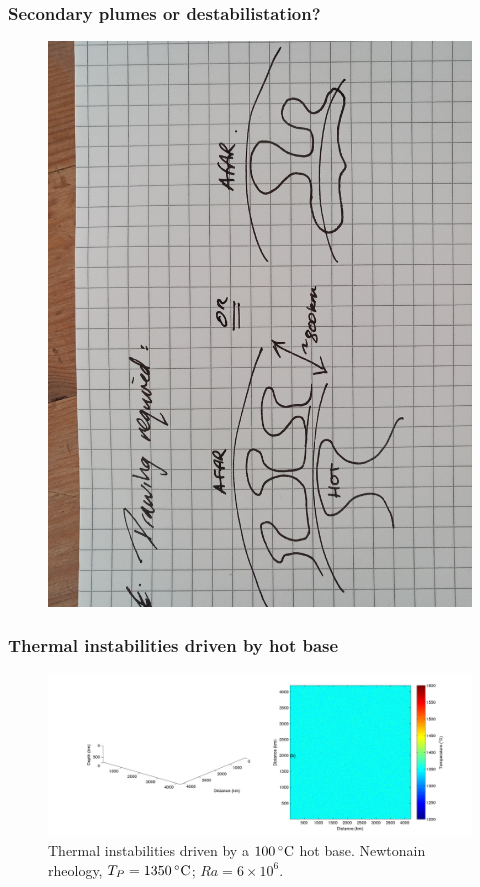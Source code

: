 \documentclass[aspectratio=169]{beamer}
\begin{document}
\begin{frame}
    \frametitle{Secondary plumes or destabilistation?}
    \begin{figure}
        \includegraphics[height=0.8\paperheight, angle=270]{./pictures/temporary-drawing-1.jpg}
    \end{figure}
\end{frame}

\begin{frame}
    \frametitle{Thermal instabilities driven by hot base}
    \begin{figure}
        \vspace{-.5cm}
        \includegraphics[width=0.85\paperwidth]{./figures/Newt100/dT1.0741_4x4_Newt_Ra6e6_0.png}
        \caption{Thermal instabilities driven by a $100\rm\,^{\circ}C$ hot base. Newtonain rheology, $T_{P}=1350\rm\,^{\circ}C$; $Ra = 6\times10^{6}$.}
    \end{figure}
\end{frame}
\end{document}
